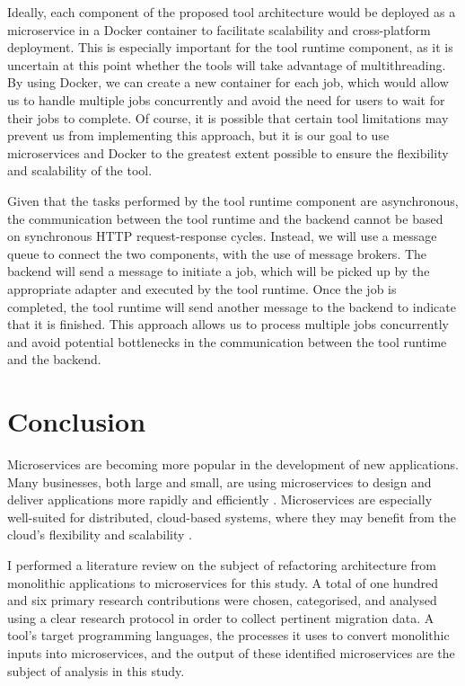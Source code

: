 \documentclass[conference]{IEEEtran}
\begin{document}
Ideally, each component of the proposed tool architecture would be deployed as
a microservice in a Docker container to facilitate scalability and
cross-platform deployment. This is especially important for the tool runtime
component, as it is uncertain at this point whether the tools will take
advantage of multithreading. By using Docker, we can create a new container for
each job, which would allow us to handle multiple jobs concurrently and avoid
the need for users to wait for their jobs to complete. Of course, it is
possible that certain tool limitations may prevent us from implementing this
approach, but it is our goal to use microservices and Docker to the greatest
extent possible to ensure the flexibility and scalability of the tool.

Given that the tasks performed by the tool runtime component are asynchronous,
the communication between the tool runtime and the backend cannot be based on
synchronous HTTP request-response cycles. Instead, we will use a message queue
to connect the two components, with the use of message brokers. The backend
will send a message to initiate a job, which will be picked up by the
appropriate adapter and executed by the tool runtime. Once the job is
completed, the tool runtime will send another message to the backend to
indicate that it is finished. This approach allows us to process multiple jobs
concurrently and avoid potential bottlenecks in the communication between the
tool runtime and the backend.

\section{Conclusion}

Microservices are becoming more popular in the development of new applications.
Many businesses, both large and small, are using microservices to design and
deliver applications more rapidly and efficiently
\cite{richardson-microservices}. Microservices are especially well-suited for
distributed, cloud-based systems, where they may benefit from the cloud's
flexibility and scalability \cite{fowler-microservices-prerequisites}.

I performed a literature review on the subject of refactoring architecture from
monolithic applications to microservices for this study. A total of one hundred
and six primary research contributions were chosen, categorised, and analysed
using a clear research protocol in order to collect pertinent migration data. A
tool's target programming languages, the processes it uses to convert
monolithic inputs into microservices, and the output of these identified
microservices are the subject of analysis in this study.
\end{document}
